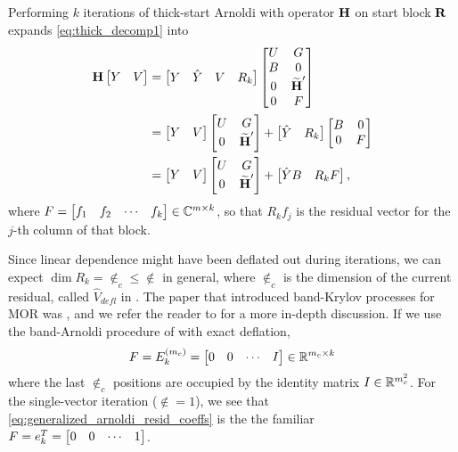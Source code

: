 Performing $k$ iterations of thick-start Arnoldi with operator $\textbf{\textup{H}}$ on start block $\textbf{\textup{R}}$ expands \eqref{eq:thick_decomp1} into 
\begin{equation}
\begin{aligned}
\textbf{\textup{H}} \begin{bmatrix} Y &V\end{bmatrix} &= \begin{bmatrix} Y & \hat{Y}&V & R_k \end{bmatrix}
\begin{bmatrix} U & G \\B& 0  \\   0&\widetilde{\textbf{\textup{H}}}^\prime\\ 0&F\end{bmatrix}\\
&= \begin{bmatrix} Y & V \end{bmatrix}
\begin{bmatrix} U & G \\ 0&\widetilde{\textbf{\textup{H}}}^\prime\end{bmatrix} +   \begin{bmatrix} \hat{Y} & R_k\end{bmatrix}\begin{bmatrix} B&0\\0&F\end{bmatrix} \\
&= \begin{bmatrix} Y & V \end{bmatrix}
\begin{bmatrix} U & G \\ 0&\widetilde{\textbf{\textup{H}}}^\prime\end{bmatrix} +  \begin{bmatrix} \hat{Y} B  &  R_k F\end{bmatrix}, 
\end{aligned}
\label{eq:thick_decomp1}
\end{equation}
where $F =\begin{bmatrix} f_1&f_2&\cdots&f_k\end{bmatrix}\in\mathbb{C}^{m\times k}$, so that $R_k f_j$ is the residual vector for the $j$-th column of that block.  

Since linear dependence might have been deflated out during iterations, we can expect $\dim R_k =  \nin_c \leq \nin$ in general, where $\nin_c$ is the dimension of the current residual,  called $\widehat{V}_{defl}$ in \cite{freund2000b}.  The paper that introduced band-Krylov processes for MOR was \cite{AliagaMIMO}, and we refer the reader to \cite{AliagaMIMO} for a more in-depth discussion.  If we use the band-Arnoldi procedure of \cite{freund2000b,AN} with exact deflation,
\begin{equation}
F = E_k^{(m_c)} =  \begin{bmatrix} 0&0&\cdots&I\end{bmatrix} \in \mathbb{R}^{m_c \times k}
\label{eq:generalized_arnoldi_resid_coeffs}
\end{equation}
where the last $\nin_c$ positions are occupied by the identity matrix $I\in\mathbb{R}^{m_c^2}$.
 For the single-vector iteration ($\nin=1$),  we see that \eqref{eq:generalized_arnoldi_resid_coeffs} is the the familiar $F=e_k^T = \begin{bmatrix} 0&0&\cdots&1\end{bmatrix}$.

